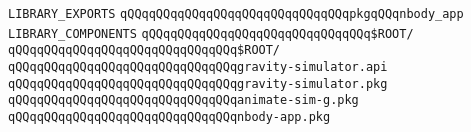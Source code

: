 \label{src/lib/x-kit/tut/nbody/nbody-app.lib}
\verb|LIBRARY_EXPORTS|\newline
\newline
\verb|qQQqqQQqqQQqqQQqqQQqqQQqqQQqqQQqpkgqQQqnbody_app|\newline
\newline
\verb|LIBRARY_COMPONENTS|\newline
\newline
\verb|qQQqqQQqqQQqqQQqqQQqqQQqqQQqqQQq$ROOT/|\newline
\verb|qQQqqQQqqQQqqQQqqQQqqQQqqQQqqQQq$ROOT/|\newline
\newline
\verb|qQQqqQQqqQQqqQQqqQQqqQQqqQQqqQQqgravity-simulator.api|\newline
\verb|qQQqqQQqqQQqqQQqqQQqqQQqqQQqqQQqgravity-simulator.pkg|\newline
\verb|qQQqqQQqqQQqqQQqqQQqqQQqqQQqqQQqanimate-sim-g.pkg|\newline
\verb|qQQqqQQqqQQqqQQqqQQqqQQqqQQqqQQqnbody-app.pkg|\newline

